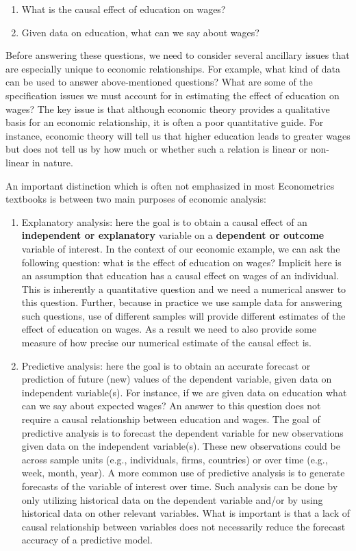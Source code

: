 \documentclass[
]{book}
\theoremstyle{definition}
\theoremstyle{definition}
\theoremstyle{definition}
\theoremstyle{definition}
\theoremstyle{remark}
\begin{document}
\begin{enumerate}
\def\labelenumi{\arabic{enumi}.}
\item
  What is the causal effect of education on wages?
\item
  Given data on education, what can we say about wages?
\end{enumerate}

Before answering these questions, we need to consider several ancillary issues that are especially unique to economic relationships. For example, what kind of data can be used to answer above-mentioned questions? What are some of the specification issues we must account for in estimating the effect of education on wages? The key issue is that although economic theory provides a qualitative basis for an economic relationship, it is often a poor quantitative guide. For instance, economic theory will tell us that higher education leads to greater wages but does not tell us by how much or whether such a relation is linear or non-linear in nature.

An important distinction which is often not emphasized in most Econometrics textbooks is between two main purposes of economic analysis:

\begin{enumerate}
\def\labelenumi{\arabic{enumi}.}
\item
  Explanatory analysis: here the goal is to obtain a causal effect of an \textbf{independent or explanatory} variable on a \textbf{dependent or outcome} variable of interest. In the context of our economic example, we can ask the following question: what is the effect of education on wages? Implicit here is an assumption that education has a causal effect on wages of an individual. This is inherently a quantitative question and we need a numerical answer to this question. Further, because in practice we use sample data for answering such questions, use of different samples will provide different estimates of the effect of education on wages. As a result we need to also provide some measure of how precise our numerical estimate of the causal effect is.
\item
  Predictive analysis: here the goal is to obtain an accurate forecast or prediction of future (new) values of the dependent variable, given data on independent variable(s). For instance, if we are given data on education what can we say about expected wages? An answer to this question does not require a causal relationship between education and wages. The goal of predictive analysis is to forecast the dependent variable for new observations given data on the independent variable(s). These new observations could be across sample units (e.g., individuals, firms, countries) or over time (e.g., week, month, year). A more common use of predictive analysis is to generate forecasts of the variable of interest over time. Such analysis can be done by only utilizing historical data on the dependent variable and/or by using historical data on other relevant variables. What is important is that a lack of causal relationship between variables does not necessarily reduce the forecast accuracy of a predictive model.
\end{enumerate}
\end{document}
